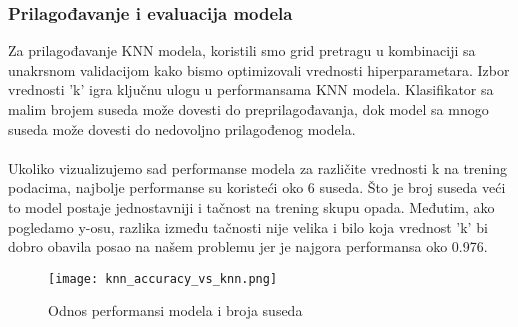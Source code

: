 \documentclass[a4paper,12pt]{article}
\begin{document}
\subsubsection{Prilagođavanje i evaluacija modela}
Za prilagođavanje KNN modela, koristili smo grid pretragu u kombinaciji sa unakrsnom validacijom kako bismo optimizovali vrednosti hiperparametara. Izbor vrednosti 'k' igra ključnu ulogu u performansama KNN modela. Klasifikator sa malim brojem suseda može dovesti do preprilagođavanja, dok model sa mnogo suseda može dovesti do nedovoljno prilagođenog modela.
\\\\Ukoliko vizualizujemo sad performanse modela za različite vrednosti k na trening podacima, najbolje performanse su koristeći oko 6 suseda. Što je broj suseda veći to model postaje jednostavniji i tačnost na trening skupu opada. Međutim, ako pogledamo y-osu, razlika između tačnosti nije velika i bilo koja vrednost 'k' bi dobro obavila posao na našem problemu jer je najgora performansa oko 0.976.

\begin{figure}[H]
\centering
\texttt{[image: knn\_accuracy\_vs\_knn.png]}
\caption{Odnos performansi modela i broja suseda}
\label{fig:knn_accuracy_vs_knn}
\end{figure}
\end{document}
